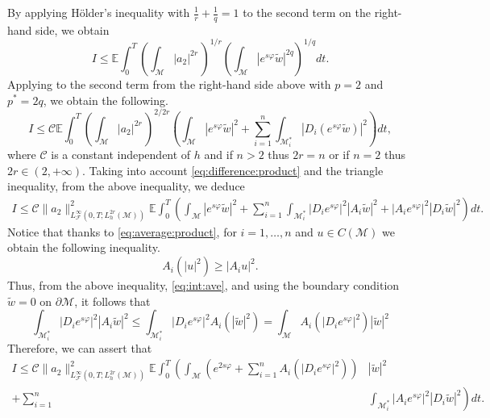 \documentclass[11pt,oneside,leqno]{amsart}
\numberwithin{equation}{section}
\numberwithin{equation}{section}
\newcommand{\E}{\mathbb{E}}
\begin{document}
By applying Hölder's inequality with $\frac{1}{r}+\frac{1}{q}=1$ to the second term on the right-hand side, we obtain
\[
I\leq \E\int_{0}^T\left(\int_{\mathcal{M}}|a_{2}|^{2r}\,\right)^{1/r}\left(\int_{\mathcal{M}}|e^{s\varphi}\tilde{w}|^{2q}\right)^{1/q}dt.
\]
Applying { \cite[Theorem 1.5]{LPP:2025} } to the second term from the right-hand side above  with $p=2$ and $p^{\ast}=2q$, we obtain the following.
\[
I\leq \mathcal{C}\E\int_{0}^T\left(\int_{\mathcal{M}}|a_{2}|^{2r}\,\right)^{2/2r}\left(\int_{\mathcal{M}}|e^{s\varphi}\tilde{w}|^{2}+\sum_{i=1}^{n}\int_{\mathcal{M}_i^{\ast}}|D_i(e^{s\varphi}\tilde{w})|^2\right)dt,
\]
where $\mathcal{C}$ is a constant independent of $h$ and if $n>2$ thus $2r=n$ or if $n=2$ thus $ 2r\in (2,+\infty)$. Taking into account \eqref{eq:difference:product} and the triangle inequality, from the above inequality, we deduce
\begin{align*}
I\leq \mathcal{C}\|a_{2}\|^2_{L^{\infty}_{\mathcal{F}}(0,T;L_{h}^{2r}(\mathcal{M}))}\E\int_0^T\left(\int_{\mathcal{M}}|e^{s\varphi}\tilde{w}|^{2}+\sum_{i=1}^{n}\int_{\mathcal{M}_{i}^\ast}|D_ie^{s\varphi}|^2|A_i\tilde{w}|^2+|A_ie^{s\varphi}|^2|D_i\tilde{w}|^2\right)dt.
\end{align*}
Notice that thanks to \eqref{eq:average:product}, for $i=1,\ldots,n$ and $u\in C(\mathcal{M})$ we obtain the following inequality.
\begin{equation}\label{eq:inequalityAverange}
    A_i(|u|^2)\geq |A_iu|^2.
\end{equation}
Thus, from the above inequality, \eqref{eq:int:ave}, and using the boundary condition $\tilde{w}=0$ on $\partial \mathcal{M}$, it follows that
\[
\int_{\mathcal{M}_{i}^\ast}|D_ie^{s\varphi}|^2|A_i\tilde{w}|^2\leq \int_{\mathcal{M}_i^{\ast}}|D_ie^{s\varphi}|^2A_i(|\tilde{w}|^2)= \int_{\mathcal{M}}A_i(|D_ie^{s\varphi}|^2)|\tilde{w}|^2
\]
Therefore, we can assert that 
\begin{align*}
I\leq \mathcal{C}\|a_{2}\|^2_{L^{\infty}_{\mathcal{F}}(0,T;L_{h}^{2r}(\mathcal{M}))}\E\int_0^T\left(\int_{\mathcal{M}}\left(e^{2s\varphi}+\sum_{i=1}^{n}A_i(|D_ie^{s\varphi}|^2)\right)\right.&|\tilde{w}|^{2}\\
+\sum_{i=1}^{n}&\left.\int_{\mathcal{M}_i^{\ast}}|A_ie^{s\varphi}|^2|D_i\tilde{w}|^2\right)dt.
\end{align*}
\end{document}
